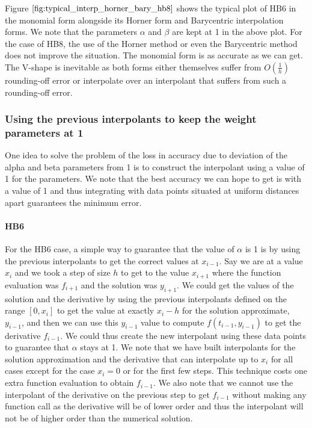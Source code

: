 \documentclass{article}
\begin{document}
Figure $\ref{fig:typical_interp_horner_bary_hb8}$ shows the typical plot of HB6 in the monomial form alongside its Horner form and Barycentric interpolation forms. We note that the parameters $\alpha$ and $\beta$ are kept at 1 in the above plot. For the case of HB8, the use of the Horner method or even the Barycentric method does not improve the situation. The monomial form is as accurate as we can get. The V-shape is inevitable as both forms either themselves suffer from $O(\frac{1}{h})$ rounding-off error or interpolate over an interpolant that suffers from such a rounding-off error.

\subsubsection{Using the previous interpolants to keep the weight parameters at 1}
\label{section:keeping_alpha_at_1}
One idea to solve the problem of the loss in accuracy due to deviation of the alpha and beta parameters from 1 is to construct the interpolant using a value of 1 for the parameters. We note that the best accuracy we can hope to get is with a value of 1 and thus integrating with data points situated at uniform distances apart guarantees the minimum error.

\paragraph{HB6} For the HB6 case, a simple way to guarantee that the value of $\alpha$ is 1 is by using the previous interpolants to get the correct values at $x_{i - 1}$. Say we are at a value $x_i$ and we took a step of size $h$ to get to the value $x_{i + 1}$ where the function evaluation was $f_{i + 1}$ and the solution was $y_{i + 1}$. We could get the values of the solution and the derivative by using the previous interpolants defined on the range $[0, x_i]$ to get the value at exactly $x_i - h$ for the solution approximate, $y_{i - 1}$, and then we can use this $y_{i-1}$ value to compute $f(t_{i-1}, y_{i-1})$ to get the derivative $f_{i - 1}$.  We could thus create the new interpolant using these data points to guarantee that $\alpha$ stays at 1. We note that we have built interpolants for the solution approximation and the derivative that  can interpolate up to $x_i$ for all cases except for the case $x_i = 0$ or for the first few steps. This technique costs one extra function evaluation to obtain $f_{i-1}$. We also note that we cannot use the interpolant of the derivative on the previous step to get $f_{i - 1}$ without making any function call as the derivative will be of lower order and thus the interpolant will not be of higher order than the numerical solution.
\end{document}
